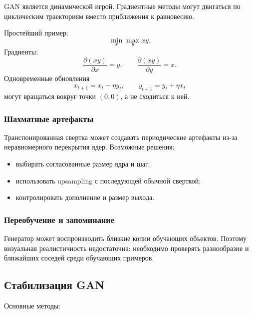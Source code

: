 \documentclass[12pt,a4paper]{article}
\numberwithin{equation}{section}
\theoremstyle{definition}
\theoremstyle{remark}
\begin{document}
GAN является динамической игрой. Градиентные методы могут двигаться
по циклическим траекториям вместо приближения к равновесию.

Простейший пример:
\[
    \min_x\max_y xy.
\]
Градиенты:
\[
    \frac{\partial(xy)}{\partial x}=y,
    \qquad
    \frac{\partial(xy)}{\partial y}=x.
\]
Одновременные обновления
\[
    x_{t+1}=x_t-\eta y_t,
    \qquad
    y_{t+1}=y_t+\eta x_t
\]
могут вращаться вокруг точки \((0,0)\), а не сходиться к ней.

\subsubsection{Шахматные артефакты}

Транспонированная свертка может создавать периодические артефакты
из-за неравномерного перекрытия ядер. Возможные решения:

\begin{itemize}
    \item выбирать согласованные размер ядра и шаг;
    \item использовать upsampling с последующей обычной сверткой;
    \item контролировать дополнение и размер выхода.
\end{itemize}

\subsubsection{Переобучение и запоминание}

Генератор может воспроизводить близкие копии обучающих объектов.
Поэтому визуальная реалистичность недостаточна: необходимо проверять
разнообразие и ближайших соседей среди обучающих примеров.

\subsection{Стабилизация GAN}

Основные методы:
\end{document}
